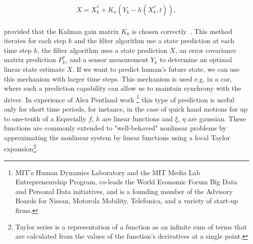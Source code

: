 \begin{equation} \label{eq:5}
X = X_{k}^{*} + K_x(Y_k - h(X_{k}^{*},t)),
\end{equation}
\\
provided that the Kalman gain matrix $K_k$ is chosen correctly~\cite{kalman}.
This method iterates for each step $k$ and the filter algorithm use a state prediction at each time step $k$, the filter algorithm
uses a state prediction $X$, an error covariance matrix prediction $P_k^*$, and a sensor measurement $Y_k$ to determine an optimal linear state estimate $X$.
If we want to predict human’s future state, we can use this mechanism with larger time steps.
This mechanism is used e.g. in a car, where such a prediction capability can allow us to maintain synchrony with the driver.
In experience of Alex Pentland work \footnote{MIT's Human Dynamics Laboratory and the MIT Media Lab Entrepreneurship
Program, co-leads the World Economic Forum Big Data and Personal Data initiatives, and is a founding member
of the Advisory Boards for Nissan, Motorola Mobility, Telefonica, and a variety of start-up firms.} this type of prediction is useful only for short time periods,
for instance, in the case of quick hand motions for up to one-tenth of a
Especially $f$, $h$ are linear functions and $\xi$, $\eta$ are gaussian.
These functions are commonly extended to "well-behaved" nonlinear problems by approximating
the nonlinear system by linear functions using a local Taylor expansion\footnote{Taylor series is a representation of a function
as an infinite sum of terms that are calculated from the values of the function's derivatives at a single point.}.

